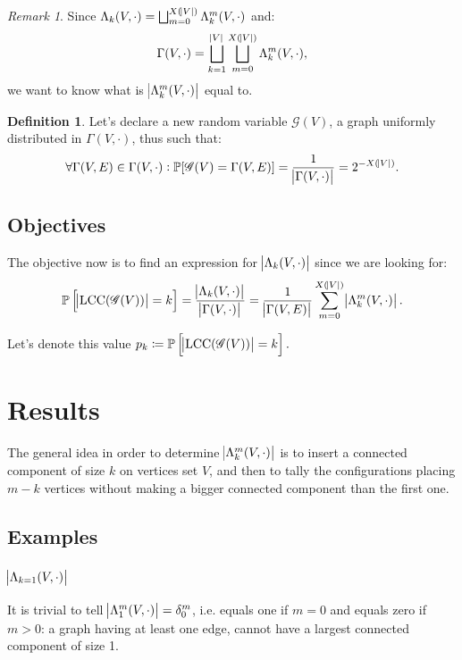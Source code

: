 \documentclass{article}
\theoremstyle{definition}
\newtheorem{definition}[lemma]{Definition}
\theoremstyle{remark}
\newtheorem*{remark}{Remark}
\DeclareMathOperator{\LCC}{LCC}
\renewcommand{\P}{\mathbb P}
\begin{document}
		\begin{remark} Since $\Lambda_k(V, \cdot) = \bigsqcup_{m=0}^{X(\abs V)}\Lambda_k^m(V, \cdot)$ and:
		\[\Gamma(V, \cdot) = \bigsqcup_{k=1}^{\abs V}\bigsqcup_{m=0}^{X(\abs V)}\Lambda_k^m(V, \cdot),\]
		we want to know what is $\abs {\Lambda_k^m(V, \cdot)}$ equal to.
		\end{remark}

		\begin{definition} Let's declare a new random variable $\mathscr G(V)$, a graph uniformly distributed in $\Gamma(V, \cdot)$, thus such that:
		\[\forall \Gamma(V, E) \in \Gamma(V, \cdot) : \P[\mathscr G(V) = \Gamma(V, E)] = \frac 1{\abs {\Gamma(V, \cdot)}} = 2^{-X(\abs V)}.\]
		\end{definition}

	\subsection{Objectives}
		The objective now is to find an expression for $\abs {\Lambda_k(V, \cdot)}$ since we are looking for:
		\[\P\left[\abs {\LCC(\mathscr G(V))} = k\right] = \frac {\abs {\Lambda_k(V, \cdot)}}{\abs {\Gamma(V, \cdot)}}
			= \frac 1{\abs {\Gamma(V, E)}}\sum_{m=0}^{X(\abs V)}\abs {\Lambda_k^m(V, \cdot)}.\]

		Let's denote this value $p_k \coloneqq \P\left[\abs {\LCC(\mathscr G(V))} = k\right].$

\section{Results}\label{sec:results}
	The general idea in order to determine $\abs {\Lambda_k^m(V, \cdot)}$ is to insert a connected component of size $k$ on vertices set $V$, and then to tally the configurations
	placing $m-k$ vertices without making a bigger connected component than the first one.

	\subsection{Examples}
		\subsubsection{$\abs {\Lambda_{k=1}(V, \cdot)}$}
			It is trivial to tell $\abs {\Lambda_1^m(V, \cdot)} = \delta_0^m$, i.e. equals one if $m=0$ and equals zero if $m>0$: a graph having at least one edge, cannot have
			a largest connected component of size 1.
\end{document}
